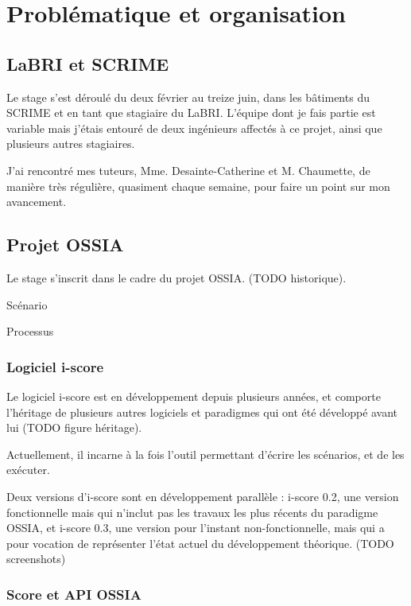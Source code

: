 \chapter{Problématique et organisation}
\section{LaBRI et SCRIME}
Le stage s'est déroulé du deux février au treize juin, dans les bâtiments du \ac{SCRIME} et en tant que stagiaire du \ac{LaBRI}. L'équipe dont je fais partie est variable mais j'étais entouré de deux ingénieurs affectés à ce projet, ainsi que plusieurs autres stagiaires.

J'ai rencontré mes tuteurs, Mme. Desainte-Catherine et M. Chaumette, de manière très régulière, quasiment chaque semaine, pour faire un point sur mon avancement.

\section{Projet OSSIA}
Le stage s'inscrit dans le cadre du projet \ac{OSSIA}.
(TODO historique).
\begin{mydef}
Scénario
\end{mydef}

\begin{mydef}
Processus
\end{mydef}

\subsection{Logiciel i-score}
Le logiciel i-score est en développement depuis plusieurs années, et comporte l'héritage de plusieurs autres logiciels et paradigmes qui ont été développé avant lui (TODO figure héritage).

Actuellement, il incarne à la fois l'outil permettant d'écrire les scénarios, et de les exécuter.

Deux versions d'i-score sont en développement parallèle : i-score 0.2, une version fonctionnelle mais qui n'inclut pas les travaux les plus récents du paradigme \ac{OSSIA}, et i-score 0.3, une version pour l'instant non-fonctionnelle, mais qui a pour vocation de représenter l'état actuel du développement théorique.
(TODO screenshots)

\subsection{Score et API OSSIA}
